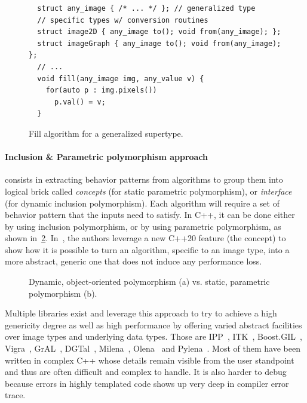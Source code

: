 \begin{figure}[tbh]
  \centering
  \begin{verbatim}
  struct any_image { /* ... */ }; // generalized type
  // specific types w/ conversion routines
  struct image2D { any_image to(); void from(any_image); };
  struct imageGraph { any_image to(); void from(any_image); };
  // ...
  void fill(any_image img, any_value v) {
    for(auto p : img.pixels())
      p.val() = v;
  }
  \end{verbatim}
  \caption{Fill algorithm for a generalized supertype.}
  \label{fig.gen.generalized}
\end{figure}

\paragraph{Inclusion \& Parametric polymorphism approach} consists in extracting behavior patterns from algorithms to
group them into logical brick called \emph{concepts} (for static parametric polymorphism), or \emph{interface} (for
dynamic inclusion polymorphism). Each algorithm will require a set of behavior pattern that the inputs need to satisfy.
In C++, it can be done either by using inclusion polymorphism, or by using parametric polymorphism, as shown
in~\ref{fig.gen.inclupoly}. In~\cite{roynard.2019.rrpr}, the authors leverage a new C++20 feature (the concept) to show
how it is possible to turn an algorithm, specific to an image type, into a more abstract, generic one that does not
induce any performance loss.

\begin{figure}[htb]
  \centering
  \hfil
  \vfil
  \hfil
  \caption{Dynamic, object-oriented polymorphism (a) vs. static, parametric polymorphism (b).}
  \label{fig.gen.inclupoly}
\end{figure}

Multiple libraries exist and leverage this approach to try to achieve a high genericity degree as well as high
performance by offering varied abstract facilities over image types and underlying data types. Those are
IPP~\cite{taylor.2004.intel}, ITK~\cite{johnson.2013.ITKSoftwareGuideThirdEdition}, Boost.GIL~\cite{bourdev.2006.bgil},
Vigra~\cite{kothe.2011.generic}, GrAL~\cite{berti.2006.gral}, DGTal~\cite{coeurjolly.2016.dgtal},
Milena~\cite{levillain.2009.ismm,levillain.2010.icip},
Olena~\cite{olena.2000.www,levillain.2011.phd,geraud.2012.hdr,levillain.2014.ciarp} and
Pylena~\cite{carlinet.2018.pylena}. Most of them have been written in complex C++ whose details remain visible from the
user standpoint and thus are often difficult and complex to handle. It is also harder to debug because errors in highly
templated code shows up very deep in compiler error trace.

